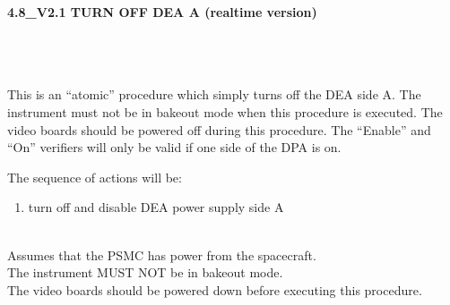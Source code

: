 \documentclass[11pt]{article}
\begin{document}
%
%
%
\newcommand{\be}{\begin{enumerate}}
\newcommand{\ee}{\end{enumerate}}
\newcommand{\bc}{\begin{center}}
\newcommand{\ec}{\end{center}}
\newcommand{\bi}{\begin{itemize}}
\newcommand{\ei}{\end{itemize}}
\newcommand{\bd}{\begin{description}}
\newcommand{\ed}{\end{description}}
\newcommand{\bt}{\begin{tabbing}}
\newcommand{\et}{\end{tabbing}}
\newcommand{\eg}{{\it e.g.~}}
\newcommand{\ie}{{\it i.e.~}}
\newcommand{\ul}{\underline}
\newcommand{\axaf}{{\em AXAF}}
\def\la{\hbox{\rlap{$<$}\lower0.5ex\hbox{$\sim$}\ }}


\large
\centerline {\bf 4.8\_V2.1 TURN OFF DEA A (realtime version) }
\vspace{0.25in}

\normalsize
{}\\
 \\


 \\
\normalsize
This is an ``atomic'' procedure which simply turns off the DEA side A.
The instrument must not be in bakeout mode when this procedure is
executed. The video boards should be powered off during this
procedure.  The ``Enable'' and ``On'' verifiers will only be valid if
one side of the DPA is on.



\vspace{0.25in}
\noindent The sequence of actions will be:
\be
\item  turn off and disable DEA power supply side A
\ee


\vspace{0.15in}
\normalsize
{} \\
\normalsize
Assumes that the PSMC has power from the spacecraft. \\
The instrument MUST NOT be in bakeout mode.\\
The video boards should be powered down before executing this procedure.\\
\end{document}
